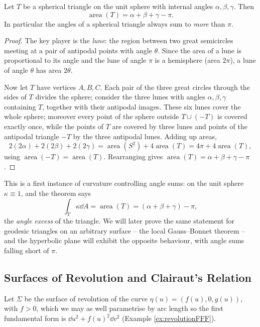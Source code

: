 \documentclass[a4paper]{scrartcl}
\begin{document}
\begin{theorem}\label{thm:sphericalGB}
    Let $T$ be a spherical triangle on the unit sphere with internal angles $\alpha, \beta, \gamma$. Then
    $$
    \operatorname{area}(T) = \alpha + \beta + \gamma - \pi.
    $$
    In particular the angles of a spherical triangle always sum to \emph{more} than $\pi$.
\end{theorem}
\begin{proof}
    The key player is the \emph{lune}: the region between two great semicircles meeting at a pair of antipodal points with angle $\theta$. Since the area of a lune is proportional to its angle and the lune of angle $\pi$ is a hemisphere (area $2\pi$), a lune of angle $\theta$ has area $2\theta$.

    Now let $T$ have vertices $A, B, C$. Each pair of the three great circles through the sides of $T$ divides the sphere; consider the three lunes with angles $\alpha, \beta, \gamma$ containing $T$, together with their antipodal images. These six lunes cover the whole sphere; moreover every point of the sphere outside $T \cup (-T)$ is covered exactly once, while the points of $T$ are covered by three lunes and points of the antipodal triangle $-T$ by the three antipodal lunes. Adding up areas,
    $$
    2(2\alpha) + 2(2\beta) + 2(2\gamma) = \operatorname{area}(S^2) + 4\operatorname{area}(T) = 4\pi + 4\operatorname{area}(T),
    $$
    using $\operatorname{area}(-T) = \operatorname{area}(T)$. Rearranging gives $\operatorname{area}(T) = \alpha + \beta + \gamma - \pi$.
\end{proof}

This is a first instance of curvature controlling angle sums: on the unit sphere $\kappa \equiv 1$, and the theorem says
$$
\int_T \kappa \dd A = \operatorname{area}(T) = (\alpha + \beta + \gamma) - \pi,
$$
the \emph{angle excess} of the triangle. We will later prove the same statement for geodesic triangles on an arbitrary surface -- the local Gauss--Bonnet theorem -- and the hyperbolic plane will exhibit the opposite behaviour, with angle sums falling short of $\pi$.

\subsection{Surfaces of Revolution and Clairaut's Relation}

Let $\Sigma$ be the surface of revolution of the curve $\eta(u) = (f(u), 0, g(u))$, with $f > 0$, which we may as well parametrise by arc length so the first fundamental form is $\dd u^2 + f(u)^2 \dd v^2$ (Example \ref{ex:revolutionFFF}).
\end{document}
